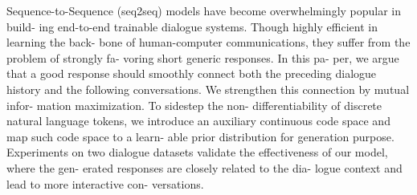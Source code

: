Sequence-to-Sequence (seq2seq) models have become overwhelmingly popular in build- ing end-to-end trainable dialogue systems. Though highly efficient in learning the back- bone of human-computer communications, they suffer from the problem of strongly fa- voring short generic responses. In this pa- per, we argue that a good response should smoothly connect both the preceding dialogue history and the following conversations. We strengthen this connection by mutual infor- mation maximization. To sidestep the non- differentiability of discrete natural language tokens, we introduce an auxiliary continuous code space and map such code space to a learn- able prior distribution for generation purpose. Experiments on two dialogue datasets validate the effectiveness of our model, where the gen- erated responses are closely related to the dia- logue context and lead to more interactive con- versations.
